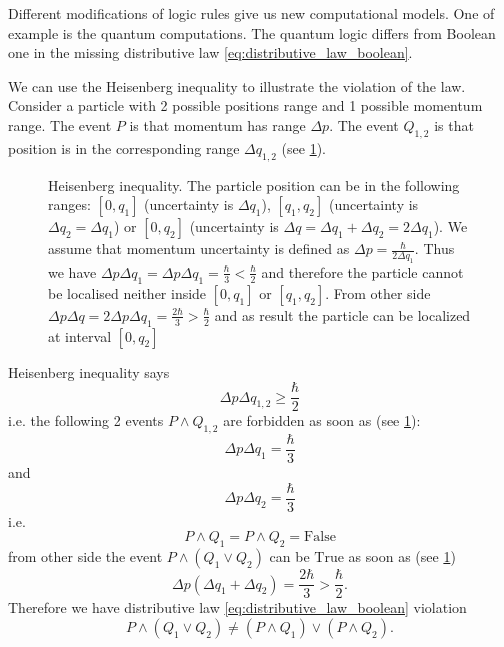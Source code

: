 Different modifications of logic rules give us new computational
models. One of example is the quantum computations. The quantum logic
differs from Boolean one in the missing distributive law
\eqref{eq:distributive_law_boolean}. 

We can use the Heisenberg inequality to illustrate the violation of
the law. Consider a particle with 2 possible positions range and 1
possible momentum range. The event $P$ is that momentum has
range $\Delta p$. The event $Q_{1,2}$ is that position is in the
corresponding range $\Delta q_{1,2}$ (see \cref{fig:heisenberg}).

\begin{figure}[H]
  \centering
  \caption{Heisenberg inequality. The particle position can be in the
    following ranges: $\left[0, q_1\right]$ (uncertainty is $\Delta
    q_1$), $\left[q_1, q_2\right]$ (uncertainty is $\Delta
    q_2 = \Delta q_1$) or $\left[0, q_2\right]$ (uncertainty is $\Delta
    q = \Delta q_1 + \Delta q_2 = 2 \Delta q_1$). We assume that
    momentum uncertainty is defined as $\Delta p = \frac{\hbar}{2
      \Delta q_1}$. Thus we have $\Delta p \Delta q_1 = \Delta p
    \Delta q_1 = \frac{\hbar}{3} < \frac{\hbar}{2}$ and therefore the particle
    cannot be localised neither inside $\left[0, q_1\right]$ or
    $\left[q_1, q_2\right]$. From other side $\Delta p \Delta q = 2
    \Delta p \Delta q_1 = \frac{2 \hbar}{3} > \frac{\hbar}{2}$ and
    as result the particle can be localized at interval $\left[0, q_2\right]$}   
  \label{fig:heisenberg}
\end{figure}

Heisenberg inequality says
\[
\Delta p \Delta q_{1,2} \geq \frac{\hbar}{2}
\]
i.e. the following 2 events $P\land Q_{1,2}$ are forbidden as soon as
(see \cref{fig:heisenberg}):
\[
\Delta p \Delta q_1 = \frac{\hbar}{3}
\]
and
\[
\Delta p \Delta q_2 = \frac{\hbar}{3}
\]
i.e.
\[
P \land Q_1 = P \land Q_2 = \mbox{False}
\]
from other side the event $P \land (Q_1 \lor Q_2)$ can be
$\mbox{True}$ as soon as (see  \cref{fig:heisenberg})
\[
\Delta p (\Delta q_1 + \Delta q_2) = \frac{2\hbar}{3} >
\frac{\hbar}{2}.
\]
Therefore we have distributive law
\eqref{eq:distributive_law_boolean} violation
\[
P \land (Q_1 \lor Q_2) \ne (P \land Q_1 ) \lor (P \land Q_2).
\]

